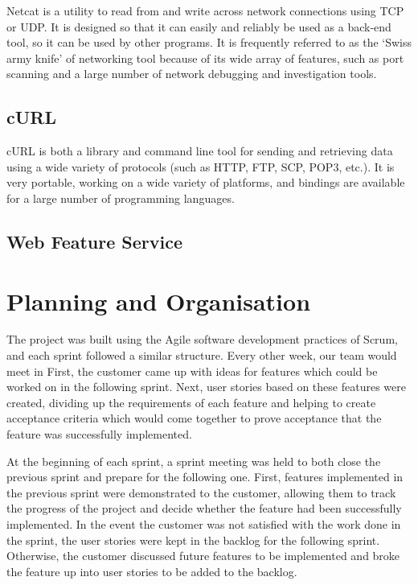 \documentclass[a4paper, 12pt]{article}
\begin{document}
Netcat is a utility to read from and write across network connections using TCP or UDP. It is designed so that it can easily and reliably be used as a back-end tool, so it can be used by other programs. It is frequently referred to as the `Swiss army knife' of networking tool because of its wide array of features, such as port scanning and a large number of network debugging and investigation tools.

\subsection{cURL}

cURL is both a library and command line tool for sending and retrieving data using a wide variety of protocols (such as HTTP, FTP, SCP, POP3, etc.). It is very portable, working on a wide variety of platforms, and bindings are available for a large number of programming languages.

\subsection{Web Feature Service}

\newpage

\section{Planning and Organisation}
\label{sec:planning}

The project was built using the Agile software development practices of Scrum, and each sprint followed a similar structure. Every other week, our team would meet in  First, the customer came up with ideas for features which could be worked on in the following sprint. Next, user stories based on these features were created, dividing up the requirements of each feature and helping to create acceptance criteria which would come together to prove acceptance that the feature was successfully implemented.

At the beginning of each sprint, a sprint meeting was held to both close the previous sprint and prepare for the following one. First, features implemented in the previous sprint were demonstrated to the customer, allowing them to track the progress of the project and decide whether the feature had been successfully implemented. In the event the customer was not satisfied with the work done in the sprint, the user stories were kept in the backlog for the following sprint. Otherwise, the customer discussed future features to be implemented and broke the feature up into user stories to be added to the backlog.
\end{document}
